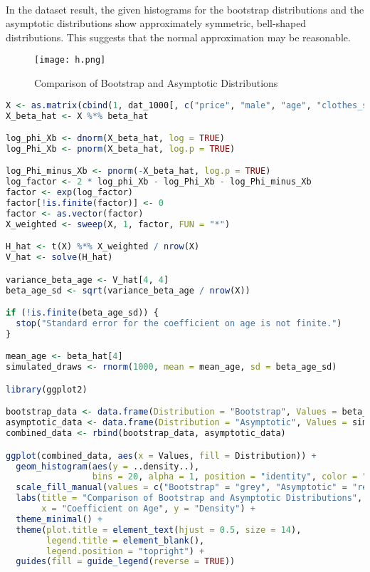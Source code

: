 \documentclass[a4paper,12pt]{article} %
\theoremstyle{nonitalic}
\newenvironment{solution}[1]
  {\renewcommand\theinnercustomsol{#1}\innercustomsol}
  {\endinnercustomsol}
\newcounter{solutionctr}[section]
\renewcommand{\thesolutionctr}{(\alph{solutionctr})}
\newenvironment{autosolution}
  {\stepcounter{solutionctr}\begin{solution}{\thesolutionctr}}
  {\end{solution}}
\begin{document}
\pagebreak
\begin{autosolution}
    \

    In the dataset result, the given histograms for the bootstrap distributions and the asymptotic distributions show approximately symmetric, bell-shaped distributions. 
    This suggests that the normal approximation may be reasonable.

    \begin{figure}[!htbp]
        \centering
        \texttt{[image: h.png]}
        \caption{Comparison of Bootstrap and Asymptotic Distributions}
        \label{fig:h}
    \end{figure}

    \begin{lstlisting}[language=R]
X <- as.matrix(cbind(1, dat_1000[, c("price", "male", "age", "clothes_shoes", "cosmetics", "food", "technology")]))
X_beta_hat <- X %*% beta_hat

log_phi_Xb <- dnorm(X_beta_hat, log = TRUE)
log_Phi_Xb <- pnorm(X_beta_hat, log.p = TRUE)

log_Phi_minus_Xb <- pnorm(-X_beta_hat, log.p = TRUE)
log_factor <- 2 * log_phi_Xb - log_Phi_Xb - log_Phi_minus_Xb
factor <- exp(log_factor)
factor[!is.finite(factor)] <- 0
factor <- as.vector(factor)
X_weighted <- sweep(X, 1, factor, FUN = "*")

H_hat <- t(X) %*% X_weighted / nrow(X)
V_hat <- solve(H_hat)

variance_beta_age <- V_hat[4, 4]
beta_age_sd <- sqrt(variance_beta_age / nrow(X))

if (!is.finite(beta_age_sd)) {
  stop("Standard error for the coefficient on age is not finite.")
}

mean_age <- beta_hat[4]
simulated_draws <- rnorm(1000, mean = mean_age, sd = beta_age_sd)

library(ggplot2)

bootstrap_data <- data.frame(Distribution = "Bootstrap", Values = beta_age_bootstrap)
asymptotic_data <- data.frame(Distribution = "Asymptotic", Values = simulated_draws)
combined_data <- rbind(bootstrap_data, asymptotic_data)

ggplot(combined_data, aes(x = Values, fill = Distribution)) +
  geom_histogram(aes(y = ..density..), 
                 bins = 20, alpha = 1, position = "identity", color = "black") +
  scale_fill_manual(values = c("Bootstrap" = "grey", "Asymptotic" = "red")) +
  labs(title = "Comparison of Bootstrap and Asymptotic Distributions",
       x = "Coefficient on Age", y = "Density") +
  theme_minimal() +
  theme(plot.title = element_text(hjust = 0.5, size = 14),
        legend.title = element_blank(),
        legend.position = "topright") +
  guides(fill = guide_legend(reverse = TRUE)) 
    \end{lstlisting}
\end{autosolution}
\end{document}
